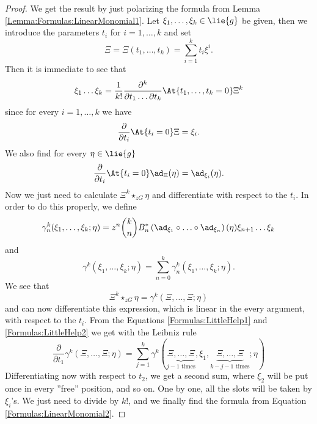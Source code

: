 \begin{proof}
	We get the result by just polarizing the formula from Lemma 
	\ref{Lemma:Formulas:LinearMonomial1}. Let $\xi_1, \ldots, \xi_k \in 
	\lie{g}$ be given, then we introduce the parameters $t_i$ for $i = 
	1, \ldots, k$ and set
	\begin{equation*}
		\Xi
		=		
		\Xi(t_1, \ldots, t_k)
		=
		\sum\limits_{i=1}^k t_i \xi^i.
	\end{equation*}
	Then it is immediate to see that
	\begin{equation*}
		\xi_1 \ldots \xi_k
		=
		\frac{1}{k!}
		\frac{\partial^k}{\partial t_1 \ldots \partial t_k}
		\At{t_1, \ldots, t_k = 0}
		\Xi^k
	\end{equation*}
	since for every $i = 1, \ldots, k$ we have
	\begin{equation}\label{Formulas:LittleHelp1}
		\frac{\partial}{\partial t_i}
		\At{t_i = 0} \Xi
		=
		\xi_i.
	\end{equation}
	We also find for every $\eta \in \lie{g}$
	\begin{equation}\label{Formulas:LittleHelp2}
		\frac{\partial}{\partial t_i}
		\At{t_i = 0} \ad_{\Xi}(\eta)
		=
		\ad_{\xi_i}(\eta).
	\end{equation}
	Now we just need to calculate $\Xi^k \star_{zG} \eta$ and 
	differentiate with respect to the $t_i$. In order to do this 
	properly, we define
	\begin{equation*}
		\gamma_n^k
		(\xi_1, \ldots, \xi_k; \eta)
		=
		z^n \binom{k}{n} B_n^*
		\left( 
			\ad_{\xi_1} 
			\circ \ldots \circ 
			\ad_{\xi_n}
		\right)
		(\eta)
		\xi_{n+1} \ldots \xi_k
	\end{equation*}
	and
	\begin{equation*}
		\gamma^k
		(\xi_1, \ldots, \xi_k; \eta)
		=
		\sum\limits_{n = 0}^k
		\gamma_n^k
		(\xi_1, \ldots, \xi_k; \eta).
	\end{equation*}
	We see that
	\begin{equation*}
		\Xi^k \star_{zG} \eta
		=
		\gamma^k
		(\Xi, \ldots, \Xi; \eta)
	\end{equation*}
	and can now differentiate this expression, which is linear in the 
	every argument, with respect to the $t_i$. From the Equations 
	\eqref{Formulas:LittleHelp1} and \eqref{Formulas:LittleHelp2} we get 
	with the Leibniz rule
	\begin{equation*}
		\frac{\partial}{\partial t_1}
		\gamma^k
		(\Xi, \ldots, \Xi; \eta)
		=
		\sum\limits_{j = 1}^k
		\gamma^k
		(
			\underbrace{\Xi, \ldots, \Xi}_{
				j-1 \text{ times}
			}
			, \xi_1, 
			\underbrace{\Xi, \ldots, \Xi}_{
				k-j-1 \text{ times}
			}
			; \eta
		)
	\end{equation*}
	Differentiating now with respect to $t_2$, we get a second sum, 
	where $\xi_2$ will be put once in every ''free'' position, and so 
	on. One by one, all the slots will be taken by $\xi_i$'s. We just 
	need to divide by $k!$, and we finally find the formula from 
	Equation \eqref{Formulas:LinearMonomial2}.
\end{proof}



